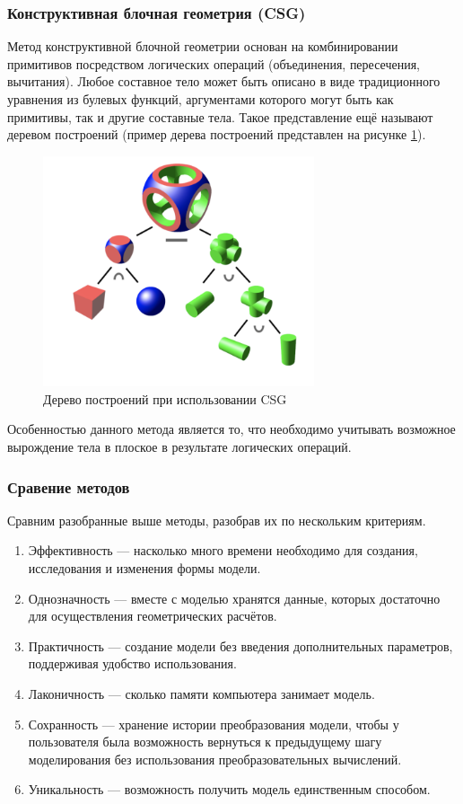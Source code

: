 \subsubsection{Конструктивная блочная геометрия (CSG)}

Метод конструктивной блочной геометрии \cite{csg} основан на комбинировании 
примитивов посредством логических операций (объединения, пересечения, 
вычитания).
Любое составное тело может быть описано в виде традиционного 
уравнения из булевых функций, аргументами которого могут быть как 
примитивы, так и другие составные тела. 
Такое представление ещё называют 
деревом построений (пример дерева построений представлен на рисунке \ref{fig:csg}).

\begin{figure}[h]
	\centering
	\captionsetup{justification=centering}
	\includegraphics[width=80mm]{img/csg.png}
	\caption{Дерево построений при использовании CSG}
	\label{fig:csg}
\end{figure}


Особенностью данного метода является то, что необходимо учитывать 
возможное вырождение тела в плоское в результате логических операций.


\subsubsection{Сравение методов}

Сравним разобранные выше методы, разобрав их по нескольким 
критериям.
\begin{enumerate}[leftmargin=1.6\parindent,label=\arabic*.]
	\item Эффективность --- насколько много времени необходимо для создания, 
	исследования и изменения формы модели.
	\item Однозначность --- вместе с моделью хранятся данные, которых 
	достаточно для осуществления геометрических расчётов.
	\item Практичность --- создание модели без введения дополнительных 
	параметров, поддерживая удобство использования.
	\item Лаконичность --- сколько памяти компьютера занимает модель.
	\item Сохранность --- хранение истории преобразования модели, чтобы у 
	пользователя была возможность вернуться к предыдущему шагу 
	моделирования без использования преобразовательных вычислений.
	\item Уникальность --- возможность получить модель единственным способом.
\end{enumerate}

